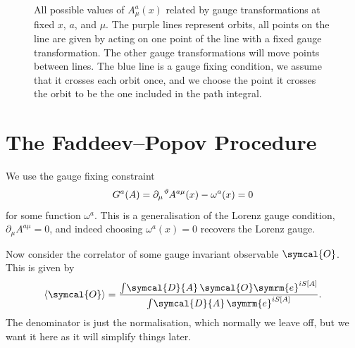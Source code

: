 \documentclass[fleqn]{NotesClass}
\newcommand{\e}{\symrm{e}}
\newcommand{\DL}[1]{\symcal{D}{#1}}
\DeclarePairedDelimiter{\correlator}{\langle}{\rangle}
\begin{document}
    \begin{figure}
        \caption{All possible values of \(A^a_\mu(x)\) related by gauge transformations at fixed \(x\), \(a\), and \(\mu\). The purple lines represent orbits, all points on the line are given by acting on one point of the line with a fixed gauge transformation. The other gauge transformations will move points between lines. The blue line is a gauge fixing condition, we assume that it crosses each orbit once, and we choose the point it crosses the orbit to be the one included in the path integral.}
    \end{figure}
    
    \section{The Faddeev--Popov Procedure}
    We use the gauge fixing constraint
    \begin{equation}
        G^a(A) = \partial_\mu \tensor[^\vartheta]{A}{^{a\mu}}(x) - \omega^a(x) = 0
    \end{equation}
    for some function \(\omega^a\).
    This is a generalisation of the Lorenz gauge condition, \(\partial_\mu A^{a\mu} = 0\), and indeed choosing \(\omega^a(x) = 0\) recovers the Lorenz gauge.
    
    Now consider the correlator of some gauge invariant observable \(\symcal{O}\).
    This is given by
    \begin{equation}
        \correlator{\symcal{O}} = \frac{\int \! \DL{A} \, \symcal{O}\e^{iS[A]}}{\int \! \DL{A} \, \e^{iS[A]}}.
    \end{equation}
    The denominator is just the normalisation, which normally we leave off, but we want it here as it will simplify things later.
    
\end{document}
